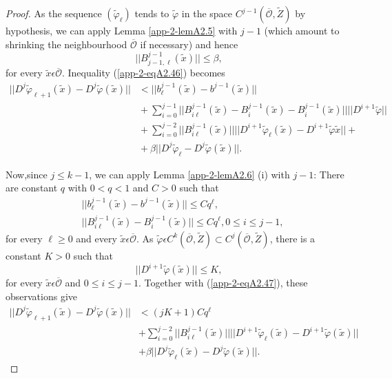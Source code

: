 \begin{proof}
As the sequence $(\widetilde{\varphi}_{\ell})$ tends to
$\widetilde{\varphi}$ in the space $C^{j-1}(\overline{\mathscr{O}},
\widetilde{Z})$ by hypothesis, we can apply Lemma \ref{app-2-lemA2.5} with $j-1$
(which amount to shrinking the neighbourhood $\overline{\mathscr{O}}$
if necessary) and hence
$$
||B_{j-1, \ell}^{j-1} (\widetilde{x})|| \leq \beta,
$$
for every $\widetilde{x} \epsilon \overline{\mathscr{O}}$. Inequality
(\ref{app-2-eqA2.46}) becomes
\begin{align*}
||D^{j}\widetilde{\varphi}_{\ell + 1}(\widetilde{x}) -
D^{j}\widetilde{\varphi}(\widetilde{x})|| &<
||b_{\ell}^{j-1}(\widetilde{x}) - b^{j-1}(\widetilde{x})||\\ 
&{} +\sum\limits_{i=0}^{j-1} ||B_{i\ell}^{j-1}(\widetilde{x}) -
B_{i}^{j-1}(\widetilde{x}) - B_{i}^{j-1}(\widetilde{x})||
||D^{i+1}\widetilde{\varphi}|| \tag{A2.47} \label{app-2-eqA2.47}\\
&{} + \sum\limits_{i=0}^{j-2} ||B_{i\ell}^{j-1} (\widetilde{x})||
||D^{i+1}\widetilde{\varphi}_{\ell} (\widetilde{x}) -
D^{i+1}\widetilde{\varphi} \widetilde{x} || + \\
&{} + \beta ||D^{j}\widetilde{\varphi}_{\ell} - D^{j}\widetilde{\varphi}(\widetilde{x})||.
\end{align*}

Now,\pageoriginale since $j \leq k - 1$, we can apply Lemma \ref{app-2-lemA2.6} (i)
with $j-1$: There are constant $q$ with $0 < q < 1$ and $C > 0$ such
that
\begin{align*}
& ||b_{\ell}^{j-1}(\widetilde{x}) - b^{j-1}(\widetilde{x})|| \leq
Cq^{\ell},\\
& ||B_{i\ell}^{j-1}(\widetilde{x}) - B_{i}^{j-1}(\widetilde{x})|| \leq
Cq^{\ell}, 0 \leq i \leq j-1,
\end{align*}
for every $\ell \geq 0$ and every $\widetilde{x} \epsilon
\overline{\mathscr{O}}$. As $\widetilde{\varphi} \epsilon
C^{k}(\overline{\mathscr{O}}, \widetilde{Z}) \subset
C^{j}(\overline{\mathscr{O}}, \widetilde{Z})$, there is a constant $K
> 0$ such that
$$
||D^{i+1} \widetilde{\varphi}(\widetilde{x})|| \leq K,
$$
for every $\widetilde{x} \epsilon \overline{\mathscr{O}}$ and $0 \leq
i \leq j-1$. Together with (\ref{app-2-eqA2.47}), these observations give
\begin{align*}
||D^{j}\widetilde{\varphi}_{\ell + 1}(\widetilde{x}) -
D^{j}\widetilde{\varphi}(\widetilde{x})|| &< (jK + 1)Cq^{\ell}\\  
&+\sum\limits_{i=0}^{j-2} ||B_{i\ell}^{j-1}(\widetilde{x})||
||D^{i+1}\widetilde{\varphi}_{\ell}(\widetilde{x}) -
D^{i+1}\widetilde{\varphi}(\widetilde{x})|| \tag{A2.48}\label{app-2-eqA2.48}\\
& + \beta ||D^{j}\widetilde{\varphi}_{\ell}(\widetilde{x}) - D^{j}\widetilde{\varphi}(\widetilde{x})||.
\end{align*}


\end{proof}
